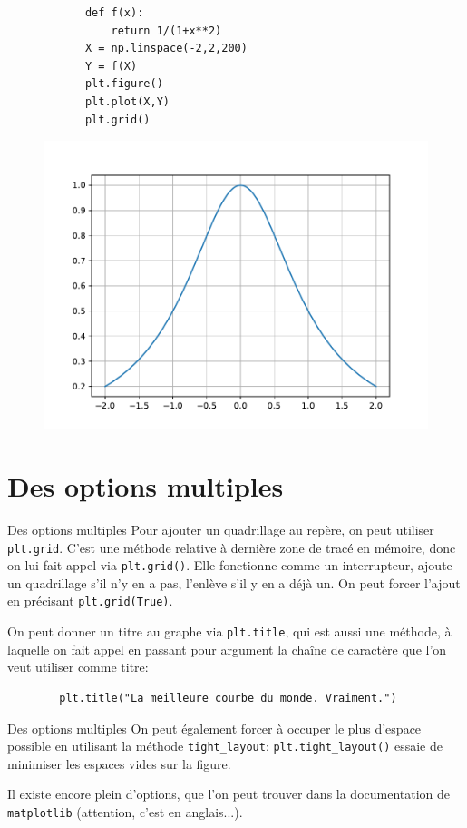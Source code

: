 \begin{frame}[fragile]
	\begin{exem}
		\begin{lstlisting}
			def f(x):
				return 1/(1+x**2)
			X = np.linspace(-2,2,200)
			Y = f(X)
			plt.figure()
			plt.plot(X,Y)
			plt.grid()
		\end{lstlisting}
	\begin{figure}
		\includegraphics[height=0.5\textheight]{exemple_matplotlib_2.pdf}
	\end{figure}
	\end{exem}
\end{frame}

\section{Des options multiples}

\begin{frame}[fragile]{Des options multiples}
	Pour ajouter un quadrillage au repère, on peut utiliser \lstinline|plt.grid|. C'est une méthode relative à dernière zone de tracé en mémoire, donc on lui fait appel via \lstinline|plt.grid()|. Elle fonctionne comme un interrupteur, ajoute un quadrillage s'il n'y en a pas, l'enlève s'il y en a déjà un. On peut forcer l'ajout en précisant \lstinline|plt.grid(True)|.\pause
	
	On peut donner un titre au graphe via \lstinline|plt.title|, qui est aussi une méthode, à laquelle on fait appel en passant pour argument la chaîne de caractère que l'on veut utiliser comme titre:
	\begin{lstlisting}
		plt.title("La meilleure courbe du monde. Vraiment.")
	\end{lstlisting}\pause
\end{frame}

\begin{frame}[fragile]{Des options multiples}
	On peut également forcer à occuper le plus d'espace possible en utilisant la méthode \lstinline|tight_layout|: \lstinline|plt.tight_layout()| essaie de minimiser les espaces vides sur la figure.\pause
	
	Il existe encore plein d'options, que l'on peut trouver dans la documentation de \lstinline|matplotlib| (attention, c'est en anglais...).
\end{frame}
